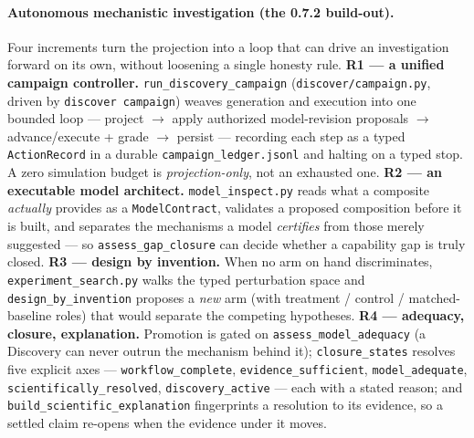 \documentclass[11pt]{article}
\newcommand{\code}[1]{\texttt{\small #1}}
\begin{document}
\paragraph{Autonomous mechanistic investigation (the 0.7.2 build-out).} Four increments turn the
projection into a loop that can drive an investigation forward on its own, without loosening a single
honesty rule. \textbf{R1 --- a unified campaign controller.} \code{run\_discovery\_campaign}
(\code{discover/campaign.py}, driven by \code{discover campaign}) weaves generation and execution into
one bounded loop --- project $\rightarrow$ apply authorized model-revision proposals $\rightarrow$
advance/execute + grade $\rightarrow$ persist --- recording each step as a typed \code{ActionRecord}
in a durable \code{campaign\_ledger.jsonl} and halting on a typed stop. A zero simulation budget is
\emph{projection-only}, not an exhausted one. \textbf{R2 --- an executable model architect.}
\code{model\_inspect.py} reads what a composite \emph{actually} provides as a \code{ModelContract},
validates a proposed composition before it is built, and separates the mechanisms a model
\emph{certifies} from those merely suggested --- so \code{assess\_gap\_closure} can decide whether a
capability gap is truly closed. \textbf{R3 --- design by invention.} When no arm on hand
discriminates, \code{experiment\_search.py} walks the typed perturbation space and
\code{design\_by\_invention} proposes a \emph{new} arm (with treatment / control / matched-baseline
roles) that would separate the competing hypotheses. \textbf{R4 --- adequacy, closure, explanation.}
Promotion is gated on \code{assess\_model\_adequacy} (a Discovery can never outrun the mechanism behind
it); \code{closure\_states} resolves five explicit axes --- \code{workflow\_complete},
\code{evidence\_sufficient}, \code{model\_adequate}, \code{scientifically\_resolved},
\code{discovery\_active} --- each with a stated reason; and \code{build\_scientific\_explanation}
fingerprints a resolution to its evidence, so a settled claim re-opens when the evidence under it moves.
\end{document}
